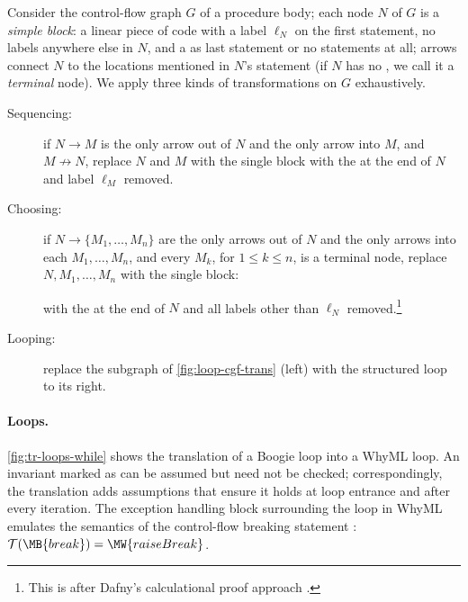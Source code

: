 \documentclass[a4paper,final]{llncs}
\makeatletter
\newif\iflong
\newcommand{\tr}{\mathcal{T}}
\DeclareRobustCommand{\openCurl}{\ensuremath{\text{\ttfamily\{}}}
\DeclareRobustCommand{\closeCurl}{\ensuremath{\text{\ttfamily\}}}}
\newcommand{\Boogie}{Boogie\xspace}
\newcommand{\WhyML}{WhyML\xspace}
\newcommand{\tightParagraph}[1]{\paragraph{#1}}
\newcommand\tightParagraph{\@startsection{paragraph}{4}{\z@}{-5\p@ \@plus -4\p@ \@minus -4\p@}{-0.5em \@plus -0.22em \@minus -0.1em}{\normalfont\normalsize\itshape}}
\makeatother
\begin{document}
Consider the control-flow graph $G$ of a procedure body; each node $N$ of $G$ is a \emph{simple block}: a linear piece of code with a label $\ell_N$ on the first statement, no labels anywhere else in $N$, and a  as last statement or no  statements at all; arrows connect $N$ to the locations mentioned in $N$'s  statement (if $N$ has no , we call it a \emph{terminal} node).
We apply three kinds of transformations on $G$ exhaustively.
\begin{description}
\item[Sequencing:] if $N \to M$ is the only arrow out of $N$ and the only arrow into $M$, and $M \not\to N$, replace $N$ and $M$ with the single block  with the  at the end of $N$ and label $\ell_M$ removed.

\item[Choosing:] if $N \to \{M_1, \ldots, M_n\}$ are the only arrows out of $N$ and the only arrows into each $M_1, \ldots, M_n$, and every $M_k$, for $1 \leq k \leq n$, is a terminal node, replace $N, M_1, \ldots, M_n$ with the single block:
\begin{center}
\B{$N$; if (*) $\openCurl M_1 \closeCurl\:$ else $\:\openCurl$if (*) $\openCurl M_2 \closeCurl\:$ else $\:\openCurl\cdots\:$ else $\:\openCurl M_n \closeCurl\closeCurl \cdots \closeCurl$} 
\end{center}
with the  at the end of $N$ and all labels other than $\ell_N$ removed.\footnote{This is after Dafny's calculational proof approach \cite{LeinoP13}.}

\item[Looping:] replace the subgraph of \autoref{fig:loop-cgf-trans} (left) with the structured loop to its right.
\end{description}
\fi






\iflong
\tightParagraph{Conditionals.}
The translation of conditionals is straightforward:
\begin{equation*}
\tr(\MB{if (b) then \{BT\} else \{BE\}}) \ =\ 
\MW{if}\ \tr(\MB{b})\ \MW{then \{}\ \tr(\MB{BT})\ \MW{\} else \{}\ \tr(\MB{BE})\;\MW{\}}
\end{equation*}
\fi

\tightParagraph{Loops.}
\autoref{fig:tr-loops-while} shows the translation of a \Boogie loop into a \WhyML loop.
An invariant marked as \B{free} can be assumed but need not be checked; correspondingly, the translation adds assumptions that ensure it holds at loop entrance and after every iteration.
The exception handling block surrounding the loop in \WhyML emulates the semantics of the control-flow breaking statement \B{break}: $\tr(\MB{break}) = \MW{raise Break}$.
\end{document}
